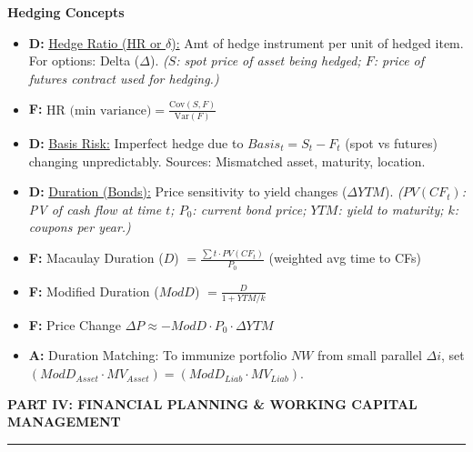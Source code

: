 \documentclass[7pt,landscape]{extarticle} %
\newcommand{\cheatsheetsection}[1]{%
  \vspace{0.25ex plus 0.1ex minus 0.05ex}%
  \noindent\color{SecTitleColor}\textbf{\sffamily\small\MakeUppercase{#1}}%
  \par\vspace{0.02ex}%
  {\color{RuleColor}\hrule height 0.3pt}\par\vspace{0.15ex}%
}
\newcommand{\cheatsheetsubsubsection}[1]{%
  \vspace{0.15ex plus 0.05ex minus 0.05ex}%
  \noindent\textbf{\sffamily\scriptsize #1}%
  \par\vspace{0.05ex}%
}
\newcommand{\D}[1]{\textbf{\textcolor{DefColor}{D:}} \uline{#1}}
\newcommand{\F}[1]{\textbf{\textcolor{FormColor}{F:}} #1}
\newcommand{\A}[1]{\textbf{\textcolor{AppColor}{A:}} #1}
\newcommand{\SF}[1]{\textit{\small (#1)}} %
\begin{document}
\begin{multicols*}{4}
  \cheatsheetsubsubsection{Hedging Concepts}
  \begin{itemize}
    \item \D{Hedge Ratio (HR or $\delta$):} Amt of hedge instrument per unit of hedged item. For options: Delta ($\Delta$).
          \SF{$S$: spot price of asset being hedged; $F$: price of futures contract used for hedging.}
    \item \F{$\text{HR (min variance)} = \frac{\text{Cov}(S,F)}{\text{Var}(F)}$}
    \item \D{Basis Risk:} Imperfect hedge due to $Basis_t = S_t - F_t$ (spot vs futures) changing unpredictably. Sources: Mismatched asset, maturity, location.
    \item \D{Duration (Bonds):} Price sensitivity to yield changes ($\Delta YTM$).
          \SF{$PV(CF_t)$: PV of cash flow at time $t$; $P_0$: current bond price; $YTM$: yield to maturity; $k$: coupons per year.}
    \item \F{Macaulay Duration ($D$) $= \frac{\sum t \cdot PV(CF_t)}{P_0}$} (weighted avg time to CFs)
    \item \F{Modified Duration ($ModD$) $= \frac{D}{1+YTM/k}$}
    \item \F{Price Change $\Delta P \approx -ModD \cdot P_0 \cdot \Delta YTM$}
    \item \A{Duration Matching: To immunize portfolio $NW$ from small parallel $\Delta i$, set $(ModD_{Asset} \cdot MV_{Asset}) = (ModD_{Liab} \cdot MV_{Liab})$.}
  \end{itemize}
  \cheatsheetsection{Part IV: Financial Planning \& Working Capital Management}
  

\end{multicols*}
\end{document}
